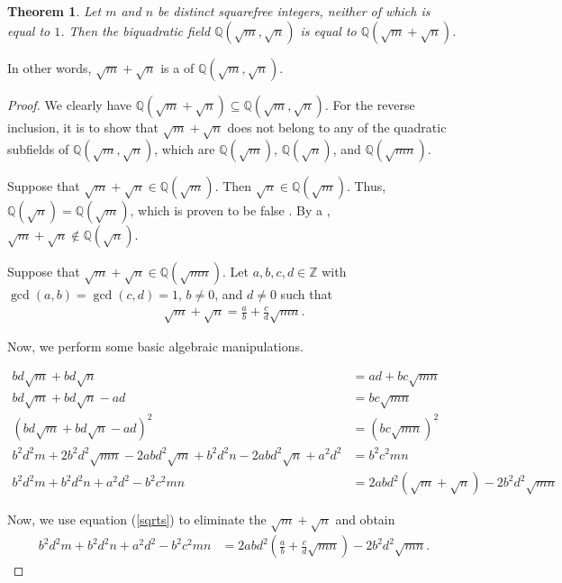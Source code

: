 \documentclass[12pt]{article}
\newtheorem*{thm*}{Theorem}
\newcommand{\Q}{\mathbb{Q}}
\newcommand{\Z}{\mathbb{Z}}
\begin{document}

\begin{thm*}
Let $m$ and $n$ be distinct squarefree integers, neither of which is equal to $1$.  Then the biquadratic field $\Q(\sqrt{m},\sqrt{n})$ is equal to $\Q(\sqrt{m}+\sqrt{n})$.
\end{thm*}

In other words, $\sqrt{m}+\sqrt{n}$ is a  of $\Q(\sqrt{m},\sqrt{n})$.

\begin{proof}
We clearly have $\Q(\sqrt{m}+\sqrt{n}) \subseteq \Q(\sqrt{m},\sqrt{n})$.  For the reverse inclusion, it is  to show that $\sqrt{m}+\sqrt{n}$ does not belong to any of the quadratic subfields of $\Q(\sqrt{m},\sqrt{n})$, which are $\Q(\sqrt{m})$, $\Q(\sqrt{n})$, and $\Q(\sqrt{mn})$.

Suppose that $\sqrt{m}+\sqrt{n}\in\Q(\sqrt{m})$.  Then $\sqrt{n}\in\Q(\sqrt{m})$.  Thus, $\Q(\sqrt{n})=\Q(\sqrt{m})$, which is proven to be false .  By a  , $\sqrt{m}+\sqrt{n}\notin\Q(\sqrt{n})$.

Suppose that $\sqrt{m}+\sqrt{n}\in\Q(\sqrt{mn})$.  Let $a,b,c,d\in\Z$ with $\gcd(a,b)=\gcd(c,d)=1$, $b\neq 0$, and $d\neq 0$ such that
\begin{align}
\label{sqrts}
\sqrt{m}+\sqrt{n}=\frac{a}{b}+\frac{c}{d}\sqrt{mn}.
\end{align}

Now, we perform some basic algebraic manipulations.

\begin{align*}
bd\sqrt{m}+bd\sqrt{n} & =ad+bc\sqrt{mn} \\
bd\sqrt{m}+bd\sqrt{n}-ad & =bc\sqrt{mn} \\
(bd\sqrt{m}+bd\sqrt{n}-ad)^2 & =(bc\sqrt{mn})^2 \\
b^2d^2m+2b^2d^2\sqrt{mn}-2abd^2\sqrt{m}+b^2d^2n-2abd^2\sqrt{n}+a^2d^2 & =b^2c^2mn \\
b^2d^2m+b^2d^2n+a^2d^2-b^2c^2mn & =2abd^2(\sqrt{m}+\sqrt{n})-2b^2d^2\sqrt{mn}
\end{align*}

Now, we use equation (\ref{sqrts}) to eliminate the $\sqrt{m}+\sqrt{n}$ and obtain
\begin{align*}
b^2d^2m+b^2d^2n+a^2d^2-b^2c^2mn & =2abd^2\left( \frac{a}{b}+\frac{c}{d}\sqrt{mn} \right) -2b^2d^2\sqrt{mn}.
\end{align*}


\end{proof}
\end{document}
